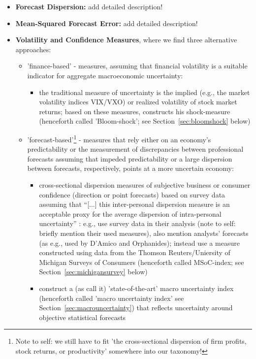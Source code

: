\documentclass[a4paper,11pt,listof=nochaptergap,oneside,pointednumbers,bibtotoc,bigheadings,liststotoc]{scrbook}
\theoremstyle{mysatz}
\theoremstyle{mydefinition}
\theoremstyle{mybemerkung}
\begin{document}
\begin{itemize}
	\item \textbf{Forecast Dispersion:} add detailed description!
	\item \textbf{Mean-Squared Forecast Error:} add detailed description!
	\item \textbf{Volatility and Confidence Measures}, where we find three alternative approaches:
		\begin{itemize}
			\item 'finance-based' - measures, assuming that financial volatility is a suitable indicator for aggregate macroeconomic uncertainty: 
			\begin{itemize}
				\item the traditional measure of uncertainty is the implied (e.g., the market volatility indices VIX/VXO) or realized volatility of stock market returns; based on these measures, \citet{bloom:09} constructs his shock-measure (henceforth called 'Bloom-shock'; see Section~\ref{sec:bloomshock} below)
			\end{itemize}
			\item 'forecast-based'\footnote{Note to self: we still have to fit 'the cross-sectional dispersion of firm profits, stock returns, or productivity' somewhere into our taxonomy!} - measures that rely either on an economy's predictability or the measurement of discrepancies between professional forecasts assuming that impeded predictability or a large dispersion between forecasts, respectively, points at a more uncertain economy:
			\begin{itemize}
				\item cross-sectional dispersion measures of subjective business or consumer confidence (direction or point forecasts) based on survey data assuming that ``[...] this inter-personal dispersion measure is an acceptable proxy for the average dispersion of intra-personal uncertainty'' \citep[p. 4]{IMF:17}: e.g., \citet{bachmannetal:13} use survey data in their analysis (note to self: briefly mention their used measures), \citet{juradoetal:15} also mention analysts' forecasts (as e.g., used by D'Amico and Orphanides); \citet{leducandliu:16} instead use a measure constructed using data from the Thomson Reuters/Uniersity of Michigan Surveys of Consumers (henceforth called MSoC-index; see Section~\ref{sec:michigansurvey} below)
				\item \citet{juradoetal:15} construct a (as \citet{orlikandveldkamp:14} call it) 'state-of-the-art' macro uncertainty index (henceforth called 'macro uncertainty index' see Section~\ref{sec:macrouncertainty}) that reflects uncertainty around objective statistical forecasts

\end{itemize}
\end{itemize}
\end{itemize}
\end{document}
